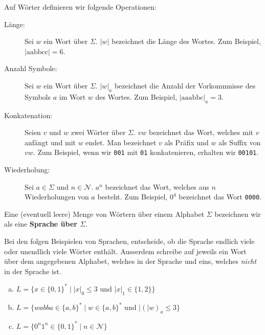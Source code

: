 \documentclass{article}
\newcommand{\abs}[1]{\lvert#1\rvert}
\begin{document}
\begin{definition}
Auf Wörter definieren wir folgende Operationen:
\begin{description}
    \item[Länge:] Sei \(w\) ein Wort über \(\Sigma\). \(\abs{w}\) bezeichnet die Länge des Wortes. Zum Beispiel, \(\abs{\text{aabbcc}}=6\).
    \item[Anzahl Symbole:] Sei \(w\) ein Wort über \(\Sigma\). \(\abs{w}_a\) bezeichnet die Anzahl der Vorkommnisse des Symbols \(a\) im Wort \(w\) des Wortes. Zum Beispiel, \(\abs{\text{aaabbc}}_a=3\).
    \item[Konkatenation:] Seien \(v\) und \(w\) zwei Wörter über \(\Sigma\). \(vw\) bezeichnet das Wort, welches mit \(v\) anfängt und mit \(w\) endet. Man bezeichnet \(v\) als Präfix und \(w\) als Suffix von \(vw\). Zum Beispiel, wenn wir \texttt{001} mit \texttt{01} konkatenieren, erhalten wir \texttt{00101}.
    \item[Wiederholung:] Sei \(a \in \Sigma\) und \(n \in \mathcal{N}\). \(a^n\) bezeichnet das Wort, welches aus \(n\) Wiederholungen von \(a\) besteht. Zum Beispiel, \(\text{0}^4\) bezeichnet das Wort \texttt{0000}.
\end{description}
\end{definition}

\begin{definition}
Eine (eventuell leere) Menge von Wörtern über einem Alphabet \(\Sigma\) bezeichnen wir als eine \textbf{Sprache über \(\Sigma\)}. 
\end{definition}

\begin{exercise}
Bei den folgen Beispielen von Sprachen, entscheide, ob die Sprache endlich viele oder unendlich viele Wörter enthält. Ausserdem schreibe auf jeweils ein Wort über dem angegebenen Alphabet, welches in der Sprache und eins, welches \emph{nicht} in der Sprache ist.

{
\begin{enumerate}[(a)]
    \item \(L = \{x \in \{0,1\}^* \mid \abs{x}_0 \leq 3 \text{ und } \abs{x}_1 \in \{1,2\}\}\) \\
    \blank[width=\linewidth]{}

    \item \(L = \{wabba \in \{a,b\}^* \mid w \in \{a, b\}^* \text{ und } \abs(w)_a \leq 3\}\) \\
    \blank[width=\linewidth]{}
    
    \item \(L = \{0^n 1^n \in \{0, 1\}^* \mid n \in \mathcal{N}\}\) \\
    \blank[width=\linewidth]{}
\end{enumerate}
}
\end{exercise}
\end{document}
